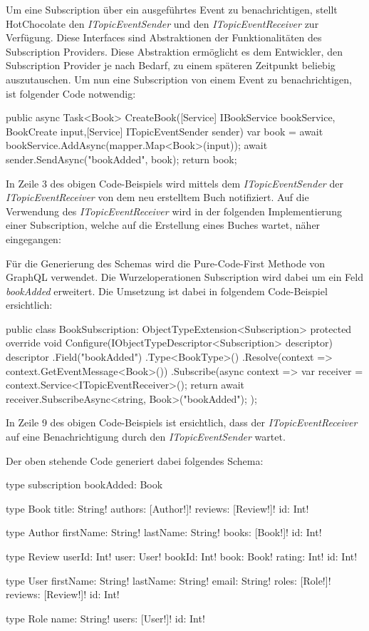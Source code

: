Um eine Subscription über ein ausgeführtes Event zu benachrichtigen, stellt HotChocolate den \textit{ITopicEventSender} und den \textit{ITopicEventReceiver} zur Verfügung.
Diese Interfaces sind Abstraktionen der Funktionalitäten des Subscription Providers.
Diese Abstraktion ermöglicht es dem Entwickler, den Subscription Provider je nach Bedarf, zu einem späteren Zeitpunkt beliebig auszutauschen.
Um nun eine Subscription von einem Event zu benachrichtigen, ist folgender Code notwendig:
\begin{JsCode}
public async Task<Book> CreateBook([Service] IBookService bookService, BookCreate input,[Service] ITopicEventSender sender) {
    var book = await bookService.AddAsync(mapper.Map<Book>(input));
    await sender.SendAsync("bookAdded", book);
    return book;
}
\end{JsCode}

In Zeile 3 des obigen Code-Beispiels wird mittels dem \textit{ITopicEventSender} der \textit{ITopicEventReceiver} von dem neu erstelltem Buch notifiziert.
Auf die Verwendung des \textit{ITopicEventReceiver} wird in der folgenden Implementierung einer Subscription, welche auf die Erstellung eines Buches wartet, näher eingegangen:

Für die Generierung des Schemas wird die Pure-Code-First Methode von GraphQL verwendet.
Die Wurzeloperationen Subscription wird dabei um ein Feld \textit{bookAdded} erweitert.
Die Umsetzung ist dabei in folgendem Code-Beispiel ersichtlich:

\begin{JsCode}
public class BookSubscription: ObjectTypeExtension<Subscription> {
    protected override void Configure(IObjectTypeDescriptor<Subscription> descriptor) {
        descriptor
        .Field("bookAdded")
        .Type<BookType>()
        .Resolve(context => context.GetEventMessage<Book>())
        .Subscribe(async context => {
            var receiver = context.Service<ITopicEventReceiver>();
            return await receiver.SubscribeAsync<string, Book>("bookAdded");
        });
    }
}    
\end{JsCode}
In Zeile 9 des obigen Code-Beispiels ist ersichtlich, dass der \textit{ITopicEventReceiver} auf eine Benachrichtigung durch den \textit{ITopicEventSender} wartet.

Der oben stehende Code generiert dabei folgendes Schema:
\begin{JsCode}
type subscription{
    bookAdded: Book
}

type Book {
  title: String!
  authors: [Author!]!
  reviews: [Review!]!
  id: Int!
}

type Author {
  firstName: String!
  lastName: String!
  books: [Book!]!
  id: Int!
}

type Review {
  userId: Int!
  user: User!
  bookId: Int!
  book: Book!
  rating: Int!
  id: Int!
}

type User {
  firstName: String!
  lastName: String!
  email: String!
  roles: [Role!]!
  reviews: [Review!]!
  id: Int!
}

type Role {
  name: String!
  users: [User!]!
  id: Int!
}
\end{JsCode} 

